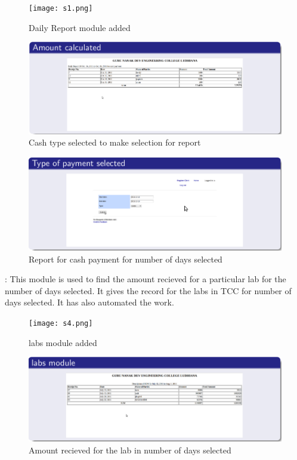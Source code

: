 \begin{figure}[h]
\centering \texttt{[image: s1.png]}
\caption{Daily Report module added}
\end{figure}
\begin{figure}[h]
\newpage
\centering \includegraphics[scale=0.4]{dp3.png}
\caption{Cash type selected to make selection for report}
\end{figure} 
\begin{figure}[h]
\centering \includegraphics[scale=0.4]{dp4.png}
\caption{Report for cash payment for number of days selected}
\end{figure} 
\begin{description}
\newpage
\item[Labs module] : This module is used to find the amount recieved for a particular lab for the number of days selected. It gives the record for the labs in TCC for number of days selected. It has also automated the work.
\end{description}
\begin{figure}[h]
\centering \texttt{[image: s4.png]}
\caption{labs module added}
\end{figure}
\newpage
\vspace{5cm}
\begin{figure}[h]
\centering \includegraphics[scale=0.4]{lb1.png}
\caption{Amount recieved for the lab in number of days selected}
\end{figure}
